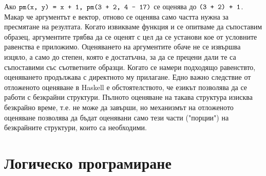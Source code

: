 \documentclass{article}
\newcommand{\cppplain}[1]{\textcolor{black}{\texttt{#1}}}
\begin{document}
Ако $\cppplain{pm(x, y) = x + 1, pm(3 + 2, 4 - 17)}$ се оценява до $\cppplain{(3 + 2) + 1}$. Макар че аргументът е вектор, отново се оценява само частта нужна за пресмятане на
резултата. \newline\newline Когато извикваме функция и се опитваме да съпоставим образец, аргументите трябва да се оценят с цел да се установи кое от условните
равенства е приложимо. Оценяването на аргументите обаче не се извършва изцяло, а само до степен, която е достатъчна, за да се прецени дали те са
съпоставими със съответните образци. Когато се намери подходящо равенствто, оценяването продължава с директното му прилагане. Едно важно следствие
от отложеното оценяване в Haskell е обстоятелството, че езикът позволява да се работи с безкрайни структури. Пълното оценяване на такава структура
изисква безкрайно време, т.е. не може да завърши, но механизмът на отложеното оценяване позволява да бъдат оценявани само тези части ("порции") на
безкрайните структури, които са необходими.

\section*{\centering \color{bordeaux}Логическо програмиране}
\end{document}
